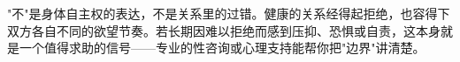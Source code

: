 \begin{tcolorbox}[colback=pink!5!white,colframe=red!50!black,title=贴心小叮咛]
"不"是身体自主权的表达，不是关系里的过错。健康的关系经得起拒绝，也容得下双方各自不同的欲望节奏。若长期因难以拒绝而感到压抑、恐惧或自责，这本身就是一个值得求助的信号——专业的性咨询或心理支持能帮你把"边界"讲清楚。
\end{tcolorbox}